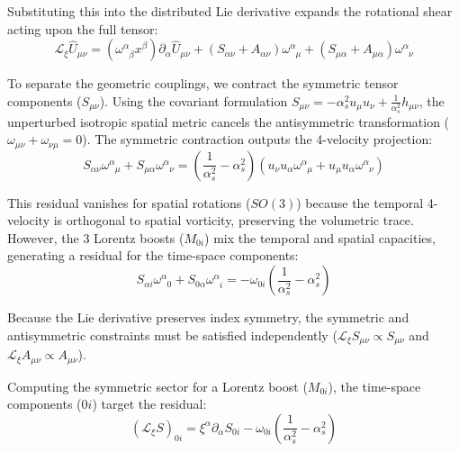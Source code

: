 Substituting this into the distributed Lie derivative expands the rotational shear acting upon the full tensor:
\begin{equation}
    \mathcal{L}_\xi \hat{U}_{\mu\nu} = (\omega^\alpha_{\phantom{\alpha}\beta} x^\beta) \partial_\alpha \hat{U}_{\mu\nu} + (S_{\alpha\nu} + A_{\alpha\nu}) \omega^\alpha_{\phantom{\alpha}\mu} + (S_{\mu\alpha} + A_{\mu\alpha}) \omega^\alpha_{\phantom{\alpha}\nu}
\end{equation}

To separate the geometric couplings, we contract the symmetric tensor components ($S_{\mu\nu}$). Using the covariant formulation $S_{\mu\nu} = -\alpha_s^2 u_\mu u_\nu + \frac{1}{\alpha_s^2} h_{\mu\nu}$, the unperturbed isotropic spatial metric cancels the antisymmetric transformation ($\omega_{\mu\nu} + \omega_{\nu\mu} = 0$). The symmetric contraction outputs the 4-velocity projection:
\begin{equation}
    S_{\alpha\nu} \omega^\alpha_{\phantom{\alpha}\mu} + S_{\mu\alpha} \omega^\alpha_{\phantom{\alpha}\nu} = \left( \frac{1}{\alpha_s^2} - \alpha_s^2 \right) (u_\nu u_\alpha \omega^\alpha_{\phantom{\alpha}\mu} + u_\mu u_\alpha \omega^\alpha_{\phantom{\alpha}\nu})
\end{equation}

This residual vanishes for spatial rotations ($SO(3)$) because the temporal 4-velocity is orthogonal to spatial vorticity, preserving the volumetric trace. However, the 3 Lorentz boosts ($M_{0i}$) mix the temporal and spatial capacities, generating a residual for the time-space components:
\begin{equation}
    S_{\alpha i} \omega^\alpha_{\phantom{\alpha}0} + S_{0\alpha} \omega^\alpha_{\phantom{\alpha}i} = -\omega_{0i} \left( \frac{1}{\alpha_s^2} - \alpha_s^2 \right)
\end{equation}

Because the Lie derivative preserves index symmetry, the symmetric and antisymmetric constraints must be satisfied independently ($\mathcal{L}_\xi S_{\mu\nu} \propto S_{\mu\nu}$ and $\mathcal{L}_\xi A_{\mu\nu} \propto A_{\mu\nu}$).

Computing the symmetric sector for a Lorentz boost ($M_{0i}$), the time-space components ($0i$) target the residual:
\begin{equation}
    (\mathcal{L}_\xi S)_{0i} = \xi^\alpha \partial_\alpha S_{0i} - \omega_{0i} \left( \frac{1}{\alpha_s^2} - \alpha_s^2 \right)
\end{equation}

